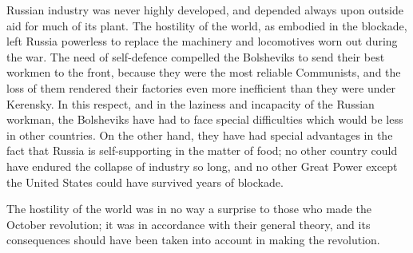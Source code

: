 Russian industry was never highly developed, and depended always upon outside aid for much of its plant. The hostility of the world, as embodied in the blockade, left Russia powerless to replace the machinery and locomotives worn out during the war. The need of self-defence compelled the Bolsheviks to send their best workmen to the front, because they were the most reliable Communists, and the loss of them rendered their factories even more inefficient than they were under Kerensky. In this respect, and in the laziness and incapacity of the Russian workman, the Bolsheviks have had to face special difficulties which would be less in other countries. On the other hand, they have had special advantages in the fact that Russia is self-supporting in the matter of food; no other country could have endured the collapse of industry so long, and no other Great Power except the United States could have survived years of blockade.

The hostility of the world was in no way a surprise to those who made the October revolution; it was in accordance with their general theory, and its consequences should have been taken into account in making the revolution.

